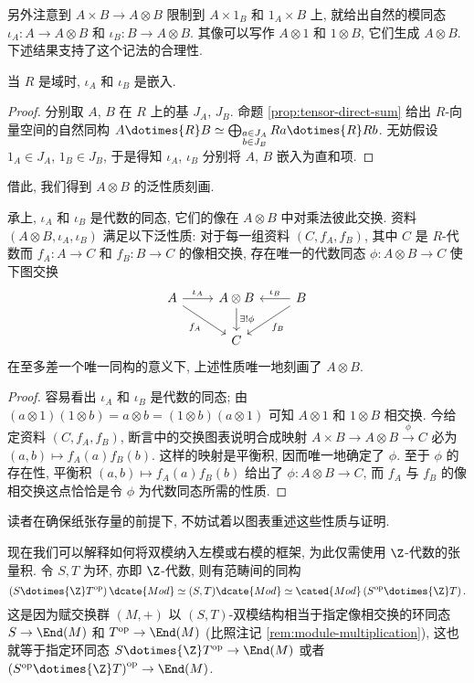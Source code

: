 另外注意到 $A \times B \to A \otimes B$ 限制到 $A \times {1_B}$ 和 ${1_A} \times B$ 上, 就给出自然的模同态 $\iota_A: A \to A \otimes B$ 和 $\iota_B: B \to A \otimes B$. 其像可以写作 $A \otimes 1$ 和 $1 \otimes B$, 它们生成 $A \otimes B$. 下述结果支持了这个记法的合理性.
\begin{lemma}
	当 $R$ 是域时, $\iota_A$ 和 $\iota_B$ 是嵌入.
\end{lemma}
\begin{proof}
	分别取 $A$, $B$ 在 $R$ 上的基 $J_A$, $J_B$. 命题 \ref{prop:tensor-direct-sum} 给出 $R$-向量空间的自然同构 $A \dotimes{R} B \simeq \bigoplus_{\substack{a \in J_A \\ b \in J_B }} Ra \dotimes{R} Rb$. 无妨假设 $1_A \in J_A$, $1_B \in J_B$, 于是得知 $\iota_A$, $\iota_B$ 分别将 $A$, $B$ 嵌入为直和项.
\end{proof}

借此, 我们得到 $A \otimes B$ 的泛性质刻画.
\begin{proposition}\label{prop:algebra-otimes-univ}
	承上, $\iota_A$ 和 $\iota_B$ 是代数的同态, 它们的像在 $A \otimes B$ 中对乘法彼此交换. 资料 $(A \otimes B, \iota_A, \iota_B)$ 满足以下泛性质: 对于每一组资料 $(C, f_A, f_B)$, 其中 $C$ 是 $R$-代数而 $f_A: A \to C$ 和 $f_B: B \to C$ 的像相交换, 存在唯一的代数同态 $\phi: A \otimes B \to C$ 使下图交换
	\[\begin{tikzcd}
	A \arrow[r, "\iota_A"] \arrow[rd, "f_A"'] & A \otimes B \arrow[d, "\exists! \phi"] & B \arrow[l, "\iota_B"'] \arrow[ld, "f_B"] \\
	& C &
	\end{tikzcd}\]
	在至多差一个唯一同构的意义下, 上述性质唯一地刻画了 $A \otimes B$.
\end{proposition}
\begin{proof}
	容易看出 $\iota_A$ 和 $\iota_B$ 是代数的同态; 由 $(a \otimes 1)(1 \otimes b) = a \otimes b = (1 \otimes b)(a \otimes 1)$ 可知 $A \otimes 1$ 和 $1 \otimes B$ 相交换. 今给定资料 $(C, f_A, f_B)$, 断言中的交换图表说明合成映射 $A \times B \to A \otimes B \xrightarrow{\phi} C$ 必为 $(a, b) \mapsto f_A(a)f_B(b)$. 这样的映射是平衡积, 因而唯一地确定了 $\phi$. 至于 $\phi$ 的存在性, 平衡积 $(a, b) \mapsto f_A(a)f_B(b)$ 给出了 $\phi: A \otimes B \to C$, 而 $f_A$ 与 $f_B$ 的像相交换这点恰恰是令 $\phi$ 为代数同态所需的性质.
\end{proof}
读者在确保纸张存量的前提下, 不妨试着以图表重述这些性质与证明.

\begin{remark}\label{rem:bimodule-as-module}
	现在我们可以解释如何将双模纳入左模或右模的框架, 为此仅需使用 $\Z$-代数的张量积. 令 $S, T$ 为环, 亦即 $\Z$-代数, 则有范畴间的同构
	\[ \left(S \dotimes{\Z} T^\text{op}\right)\dcate{Mod} \simeq (S,T)\dcate{Mod} \simeq \cated{Mod}\left(S^\text{op} \dotimes{\Z} T\right). \]
	这是因为赋交换群 $(M,+)$ 以 $(S,T)$-双模结构相当于指定像相交换的环同态 $S \to \End(M)$ 和 $T^\text{op} \to \End(M)$ (比照注记 \ref{rem:module-multiplication}), 这也就等于指定环同态 $S \dotimes{\Z} T^\text{op} \to \End(M)$ 或者 $\left( S^\text{op} \dotimes{\Z} T \right)^\text{op} \to \End(M)$.
\end{remark}

